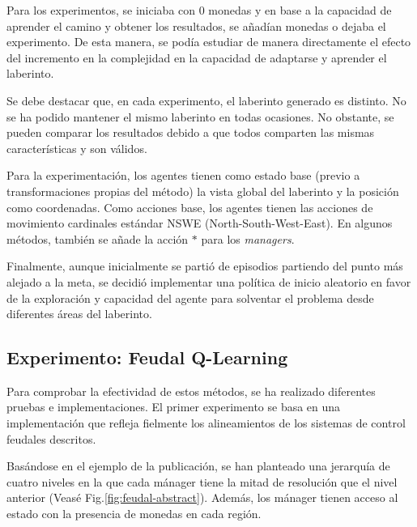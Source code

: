 \documentclass[letterpaper]{article} %
\begin{document}
Para los experimentos, se iniciaba con 0 monedas y en base a la capacidad de aprender el camino y obtener los resultados, se añadían monedas o dejaba el experimento.
De esta manera, se podía estudiar de manera directamente el efecto del incremento en la complejidad en la capacidad de adaptarse y aprender el laberinto. 

Se debe destacar que, en cada experimento, el laberinto generado es distinto. No se ha podido mantener el mismo laberinto en todas ocasiones. No obstante,
se pueden comparar los resultados debido a que todos comparten las mismas características y son válidos.

Para la experimentación, los agentes tienen como estado base (previo a transformaciones propias del método) la vista global del laberinto y la posición como coordenadas. 
Como acciones base, los agentes tienen las acciones de movimiento cardinales estándar NSWE (North-South-West-East). En algunos métodos, 
también se añade la acción $*$ para los \textit{managers}.

Finalmente, aunque inicialmente se partió de episodios partiendo del punto más alejado a la meta, se decidió implementar una política de inicio aleatorio en favor de la exploración y capacidad del agente para solventar el problema desde diferentes áreas del laberinto.

\subsection{Experimento: Feudal Q-Learning}
Para comprobar la efectividad de estos métodos, se ha realizado diferentes pruebas e implementaciones. El primer experimento
se basa en una implementación que refleja fielmente los alineamientos de los sistemas de control feudales descritos. 

Basándose en el ejemplo de la publicación, se han planteado una jerarquía de cuatro niveles en la que cada mánager tiene la mitad de resolución 
que el nivel anterior (Veasé Fig.\ref{fig:feudal-abstract}). Además, los mánager tienen acceso al estado con la presencia de monedas en cada región.  
\end{document}
